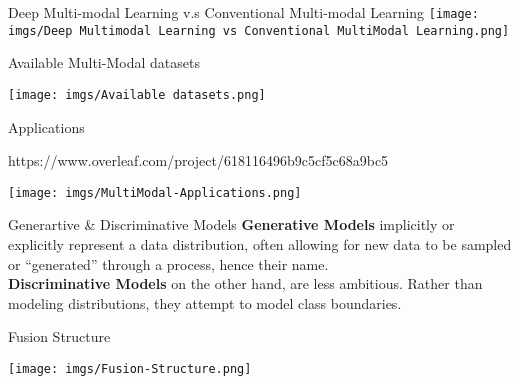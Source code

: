 \documentclass[aspectratio=169]{beamer}
\begin{document}
\begin{frame}{Deep Multi-modal Learning v.s Conventional Multi-modal Learning}
    \texttt{[image: imgs/Deep Multimodal Learning vs
        Conventional MultiModal Learning.png]}
\end{frame}

\begin{frame}{Available Multi-Modal datasets}
    \begin{center}

        \texttt{[image: imgs/Available
            datasets.png]}
    \end{center}
\end{frame}

\begin{frame}{Applications}
    \begin{center}https://www.overleaf.com/project/618116496b9c5cf5c68a9bc5

        \texttt{[image: imgs/MultiModal-Applications.png]}
    \end{center}
\end{frame}

\begin{frame}{Generartive \& Discriminative Models}
    \Large\textbf{Generative Models} implicitly or explicitly represent a data
    distribution, often allowing for new data to be sampled or “generated”
    through a process, hence their name. \\
    \Large\textbf{Discriminative Models} on the other hand, are less ambitious.
    Rather than modeling distributions, they attempt to model class boundaries.
    \\
\end{frame}

\begin{frame}{Fusion Structure}
    \begin{center}

        \texttt{[image: imgs/Fusion-Structure.png]}
    \end{center}
\end{frame}
\end{document}
